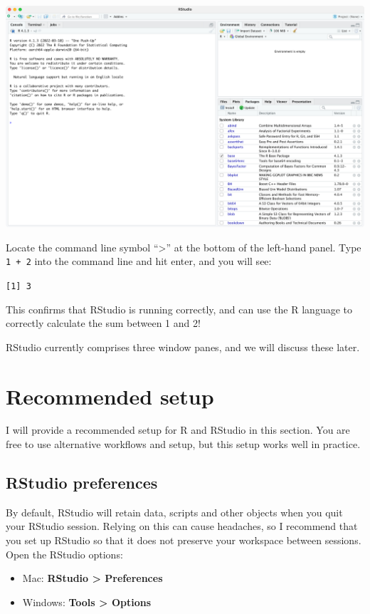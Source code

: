 \documentclass[
]{memoir}
\begin{document}
\includegraphics[width=1\linewidth]{img/RStudio-screenshot-01}

Locate the command line symbol ``\textgreater{}'' at the bottom of the left-hand panel. Type \texttt{1\ +\ 2} into the command line and hit enter, and you will see:

\texttt{{[}1{]}\ 3}

This confirms that RStudio is running correctly, and can use the R language to correctly calculate the sum between 1 and 2!

RStudio currently comprises three window panes, and we will discuss these later.

\hypertarget{recommended-setup}{%
\section{Recommended setup}\label{recommended-setup}}

I will provide a recommended setup for R and RStudio in this section. You are free to use alternative workflows and setup, but this setup works well in practice.

\hypertarget{rstudio-preferences}{%
\subsection{RStudio preferences}\label{rstudio-preferences}}

By default, RStudio will retain data, scripts and other objects when you quit your RStudio session. Relying on this can cause headaches, so I recommend that you set up RStudio so that it does not preserve your workspace between sessions. Open the RStudio options:

\begin{itemize}
\item
  Mac: \textbf{RStudio \textgreater{} Preferences}
\item
  Windows: \textbf{Tools \textgreater{} Options}
\end{itemize}
\end{document}
